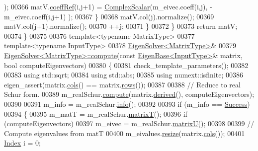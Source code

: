 \begin{DoxyCode}
      );
00366         matV.\hyperlink{class_eigen_1_1_plain_object_base_a25626a55b26a4323565f79d1b7c48ea8}{coeffRef}(i,j+1) = \hyperlink{group___eigenvalues___module_a4d0b2a773357d0a6ec98e026f04002ed}{ComplexScalar}(m\_eivec.coeff(i,j), -m\_eivec.coeff(i,j+1)
      );
00367       \}
00368       matV.col(j).normalize();
00369       matV.col(j+1).normalize();
00370       ++j;
00371     \}
00372   \}
00373   \textcolor{keywordflow}{return} matV;
00374 \}
00375 
00376 \textcolor{keyword}{template}<\textcolor{keyword}{typename} MatrixType>
00377 \textcolor{keyword}{template}<\textcolor{keyword}{typename} InputType>
00378 \hyperlink{group___eigenvalues___module_class_eigen_1_1_eigen_solver}{EigenSolver<MatrixType>}& 
00379 \hyperlink{group___eigenvalues___module_a38d032b75b3e75640e3db42e7ab20c24}{EigenSolver<MatrixType>::compute}(\textcolor{keyword}{const} 
      \hyperlink{group___core___module_struct_eigen_1_1_eigen_base}{EigenBase<InputType>}& matrix, \textcolor{keywordtype}{bool} computeEigenvectors)
00380 \{
00381   check\_template\_parameters();
00382   
00383   \textcolor{keyword}{using} std::sqrt;
00384   \textcolor{keyword}{using} std::abs;
00385   \textcolor{keyword}{using} numext::isfinite;
00386   eigen\_assert(matrix.\hyperlink{group___core___module_a7b0b45c7351847696c911ce8aa2abbdb}{cols}() == matrix.\hyperlink{group___core___module_a8141320ba8df384426c298b32b000d8e}{rows}());
00387 
00388   \textcolor{comment}{// Reduce to real Schur form.}
00389   m\_realSchur.\hyperlink{group___eigenvalues___module_a60caf9ffad11d728ea458c4dd36d0a98}{compute}(matrix.\hyperlink{group___core___module_a324b16961a11d2ecfd2d1b7dd7946545}{derived}(), computeEigenvectors);
00390   
00391   m\_info = m\_realSchur.\hyperlink{group___eigenvalues___module_a386fd2b1a3a8401eca7183ac074deec8}{info}();
00392 
00393   \textcolor{keywordflow}{if} (m\_info == \hyperlink{group__enums_gga85fad7b87587764e5cf6b513a9e0ee5ea52581b035f4b59c203b8ff999ef5fcea}{Success})
00394   \{
00395     m\_matT = m\_realSchur.\hyperlink{group___eigenvalues___module_abb78996b43b8642a5f507415730445cb}{matrixT}();
00396     \textcolor{keywordflow}{if} (computeEigenvectors)
00397       m\_eivec = m\_realSchur.\hyperlink{group___eigenvalues___module_a85622ccbecff99c8933d21f0a22b22bb}{matrixU}();
00398   
00399     \textcolor{comment}{// Compute eigenvalues from matT}
00400     m\_eivalues.\hyperlink{class_eigen_1_1_plain_object_base_a99d9054ee2d5a40c6e00ded0265e9cea}{resize}(matrix.\hyperlink{group___core___module_a7b0b45c7351847696c911ce8aa2abbdb}{cols}());
00401     \hyperlink{group___eigenvalues___module_a5bff6a6bc0efac67d52c60c2c3deb9ee}{Index} i = 0;

\end{DoxyCode}
